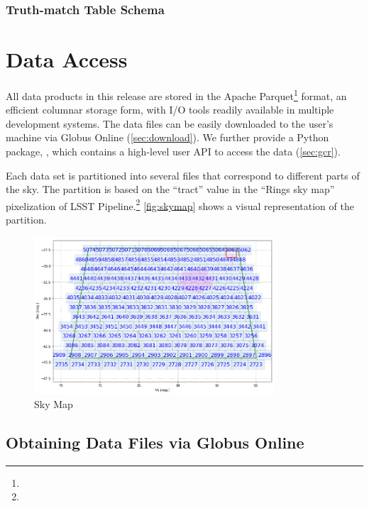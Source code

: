 \documentclass[11pt]{report}
\begin{document}
\subsubsection{Truth-match Table Schema}





\section{Data Access}
\label{sec:access}

All data products in this release are stored in the Apache Parquet\footnote{} format, an efficient columnar storage form, with I/O tools readily available in multiple development systems. 
The data files can be easily downloaded to the user's machine via Globus Online (\autoref{sec:download}). 
We further provide a Python package, , which contains a high-level user API to access the data (\autoref{sec:gcr}). 

Each data set is partitioned into several files that correspond to different parts of the sky. The partition is based on the ``tract'' value in the ``Rings sky map'' pixelization of LSST Pipeline.\footnote{} \autoref{fig:skymap} shows a visual representation of the partition. 

\begin{figure}[tbh!]
    \centering
    \includegraphics[width=0.8\textwidth]{figs/skymap.png}
    \caption{Sky Map}
    \label{fig:skymap}
\end{figure}



\subsection{Obtaining Data Files via Globus Online}
\label{sec:download}
\end{document}
